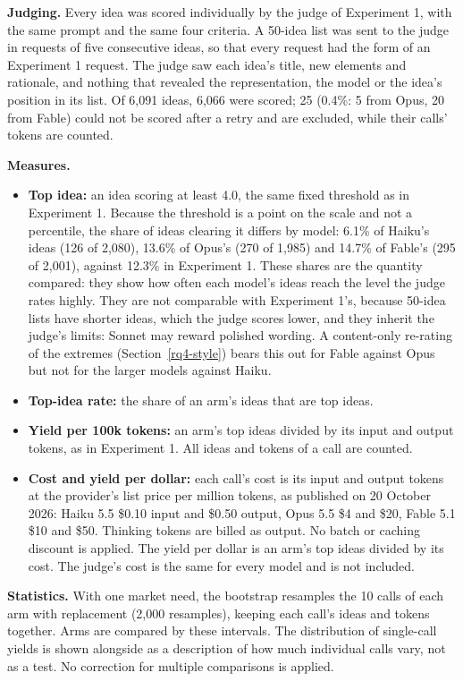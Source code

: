 \textbf{Judging.} Every idea was scored individually by the judge of Experiment 1, with the same prompt and the same four criteria. A 50-idea list was sent to the judge in requests of five consecutive ideas, so that every request had the form of an Experiment 1 request. The judge saw each idea's title, new elements and rationale, and nothing that revealed the representation, the model or the idea's position in its list. Of 6,091 ideas, 6,066 were scored; 25 (0.4\%: 5 from Opus, 20 from Fable) could not be scored after a retry and are excluded, while their calls' tokens are counted.

\textbf{Measures.}
\begin{itemize}
\tightlist
\item
  \textbf{Top idea:} an idea scoring at least 4.0, the same fixed threshold as in Experiment 1. Because the threshold is a point on the scale and not a percentile, the share of ideas clearing it differs by model: 6.1\% of Haiku's ideas (126 of 2,080), 13.6\% of Opus's (270 of 1,985) and 14.7\% of Fable's (295 of 2,001), against 12.3\% in Experiment 1. These shares are the quantity compared: they show how often each model's ideas reach the level the judge rates highly. They are not comparable with Experiment 1's, because 50-idea lists have shorter ideas, which the judge scores lower, and they inherit the judge's limits: Sonnet may reward polished wording. A content-only re-rating of the extremes (Section~\ref{rq4-style}) bears this out for Fable against Opus but not for the larger models against Haiku.
\item
  \textbf{Top-idea rate:} the share of an arm's ideas that are top ideas.
\item
  \textbf{Yield per 100k tokens:} an arm's top ideas divided by its input and output tokens, as in Experiment 1. All ideas and tokens of a call are counted.
\item
  \textbf{Cost and yield per dollar:} each call's cost is its input and output tokens at the provider's list price per million tokens, as published on 20 October 2026: Haiku 5.5 \$0.10 input and \$0.50 output, Opus 5.5 \$4 and \$20, Fable 5.1 \$10 and \$50. Thinking tokens are billed as output. No batch or caching discount is applied. The yield per dollar is an arm's top ideas divided by its cost. The judge's cost is the same for every model and is not included.
\end{itemize}

\textbf{Statistics.} With one market need, the bootstrap resamples the 10 calls of each arm with replacement (2,000 resamples), keeping each call's ideas and tokens together. Arms are compared by these intervals. The distribution of single-call yields is shown alongside as a description of how much individual calls vary, not as a test. No correction for multiple comparisons is applied.

